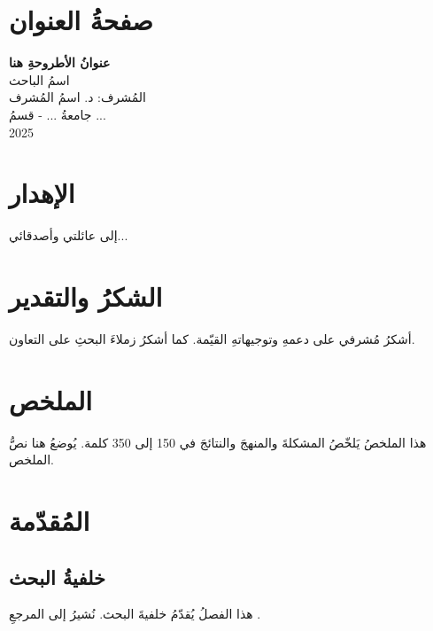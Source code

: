 \documentclass[12pt, a4paper]{book}
\begin{document}
\frontmatter

\chapter*{صفحةُ العنوان}
\begin{center}
\vspace{2cm}
{\Large \textbf{عنوانُ الأطروحةِ هنا}}\\[1cm]
{\large اسمُ الباحث}\\[0.5cm]
{\large المُشرف: د. اسمُ المُشرف}\\[0.5cm]
{\large جامعةُ ... - قسمُ ...}\\[0.5cm]
{\large 2025}
\end{center}

\clearpage

\chapter*{الإهدار}
\begin{center}
إلى عائلتي وأصدقائي...
\end{center}

\clearpage

\chapter*{الشكرُ والتقدير}
أشكرُ مُشرفي على دعمهِ وتوجيهاتهِ القيّمة. كما أشكرُ زملاءَ البحثِ على التعاون.

\clearpage

\chapter*{الملخص}
هذا الملخصُ يَلخّصُ المشكلةَ والمنهجَ والنتائجَ في 150 إلى 350 كلمة. يُوضعُ هنا نصُّ الملخص.

\clearpage

\tableofcontents
\listoffigures
\listoftables

\mainmatter

\chapter{المُقدّمة}
\section{خلفيةُ البحث}
هذا الفصلُ يُقدّمُ خلفيةَ البحث. نُشيرُ إلى المرجعِ \textcite{knuth1984}.
\end{document}
